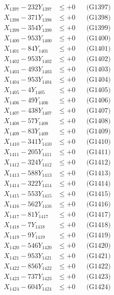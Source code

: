 \documentclass[a4paper,10pt]{article}
\begin{document}
{\begin{align}
X_{1397} - 232Y_{1397} &\leq +0 && \text{(G1397)} \\
X_{1398} - 371Y_{1398} &\leq +0 && \text{(G1398)} \\
X_{1399} - 354Y_{1399} &\leq +0 && \text{(G1399)} \\
X_{1400} - 953Y_{1400} &\leq +0 && \text{(G1400)} \\
\allowbreak
X_{1401} - 84Y_{1401} &\leq +0 && \text{(G1401)} \\
X_{1402} - 953Y_{1402} &\leq +0 && \text{(G1402)} \\
X_{1403} - 493Y_{1403} &\leq +0 && \text{(G1403)} \\
X_{1404} - 953Y_{1404} &\leq +0 && \text{(G1404)} \\
X_{1405} - 4Y_{1405} &\leq +0 && \text{(G1405)} \\
X_{1406} - 49Y_{1406} &\leq +0 && \text{(G1406)} \\
X_{1407} - 438Y_{1407} &\leq +0 && \text{(G1407)} \\
X_{1408} - 57Y_{1408} &\leq +0 && \text{(G1408)} \\
X_{1409} - 83Y_{1409} &\leq +0 && \text{(G1409)} \\
X_{1410} - 341Y_{1410} &\leq +0 && \text{(G1410)} \\
\allowbreak
X_{1411} - 205Y_{1411} &\leq +0 && \text{(G1411)} \\
X_{1412} - 324Y_{1412} &\leq +0 && \text{(G1412)} \\
X_{1413} - 588Y_{1413} &\leq +0 && \text{(G1413)} \\
X_{1414} - 322Y_{1414} &\leq +0 && \text{(G1414)} \\
X_{1415} - 553Y_{1415} &\leq +0 && \text{(G1415)} \\
X_{1416} - 562Y_{1416} &\leq +0 && \text{(G1416)} \\
X_{1417} - 81Y_{1417} &\leq +0 && \text{(G1417)} \\
X_{1418} - 7Y_{1418} &\leq +0 && \text{(G1418)} \\
X_{1419} - 9Y_{1419} &\leq +0 && \text{(G1419)} \\
X_{1420} - 546Y_{1420} &\leq +0 && \text{(G1420)} \\
\allowbreak
X_{1421} - 953Y_{1421} &\leq +0 && \text{(G1421)} \\
X_{1422} - 856Y_{1422} &\leq +0 && \text{(G1422)} \\
X_{1423} - 737Y_{1423} &\leq +0 && \text{(G1423)} \\
X_{1424} - 604Y_{1424} &\leq +0 && \text{(G1424)} \\

\end{align}}
\end{document}
